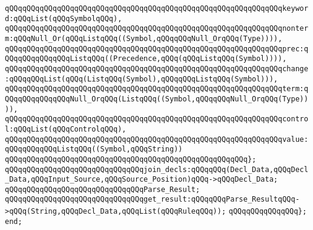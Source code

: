 \verb|qQQqqQQqqQQqqQQqqQQqqQQqqQQqqQQqqQQqqQQqqQQqqQQqqQQqqQQqqQQqqQQqkeyword:qQQqList(qQQqSymbolqQQq),|\newline
\verb|qQQqqQQqqQQqqQQqqQQqqQQqqQQqqQQqqQQqqQQqqQQqqQQqqQQqqQQqqQQqqQQqnonterm:qQQqNull_Or(qQQqListqQQq((Symbol,qQQqqQQqNull_OrqQQq(Type)))),|\newline
\verb|qQQqqQQqqQQqqQQqqQQqqQQqqQQqqQQqqQQqqQQqqQQqqQQqqQQqqQQqqQQqqQQqprec:qQQqqQQqqQQqqQQqListqQQq((Precedence,qQQq(qQQqListqQQq(Symbol)))),|\newline
\verb|qQQqqQQqqQQqqQQqqQQqqQQqqQQqqQQqqQQqqQQqqQQqqQQqqQQqqQQqqQQqqQQqchange:qQQqqQQqList(qQQq(ListqQQq(Symbol),qQQqqQQqListqQQq(Symbol))),|\newline
\verb|qQQqqQQqqQQqqQQqqQQqqQQqqQQqqQQqqQQqqQQqqQQqqQQqqQQqqQQqqQQqqQQqterm:qQQqqQQqqQQqqQQqNull_OrqQQq(ListqQQq((Symbol,qQQqqQQqNull_OrqQQq(Type)))),|\newline
\verb|qQQqqQQqqQQqqQQqqQQqqQQqqQQqqQQqqQQqqQQqqQQqqQQqqQQqqQQqqQQqqQQqcontrol:qQQqList(qQQqControlqQQq),|\newline
\verb|qQQqqQQqqQQqqQQqqQQqqQQqqQQqqQQqqQQqqQQqqQQqqQQqqQQqqQQqqQQqqQQqvalue:qQQqqQQqqQQqListqQQq((Symbol,qQQqString))|\newline
\verb|qQQqqQQqqQQqqQQqqQQqqQQqqQQqqQQqqQQqqQQqqQQqqQQqqQQqqQQq};|\newline
\newline
\verb|qQQqqQQqqQQqqQQqqQQqqQQqqQQqqQQqjoin_decls:qQQqqQQq(Decl_Data,qQQqDecl_Data,qQQqInput_Source,qQQqSource_Position)qQQq->qQQqDecl_Data;|\newline
\newline
\verb|qQQqqQQqqQQqqQQqqQQqqQQqqQQqqQQqParse_Result;|\newline
\newline
\verb|qQQqqQQqqQQqqQQqqQQqqQQqqQQqqQQqget_result:qQQqqQQqParse_ResultqQQq->qQQq(String,qQQqDecl_Data,qQQqList(qQQqRuleqQQq));|\newline
\verb|qQQqqQQqqQQqqQQq};|\newline
\verb|end;|\newline

